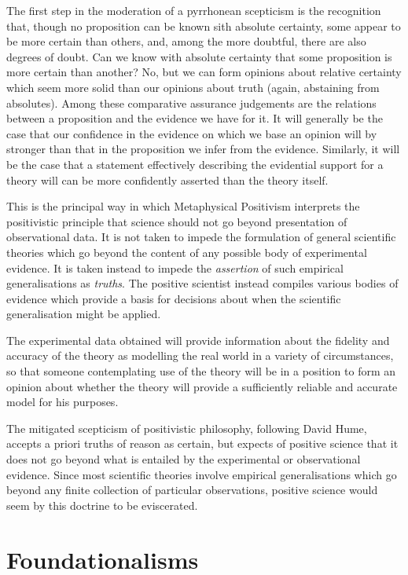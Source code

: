 The first step in the moderation of a pyrrhonean scepticism is the
recognition that, though no proposition can be known sith absolute certainty,
some appear to be more certain than others, and, among the more doubtful,
there are also degrees of doubt.
Can we know with absolute certainty that some proposition is more
certain than another?
No, but we can form opinions about relative certainty which seem
more solid than our opinions about truth (again, abstaining
from absolutes).
Among these comparative assurance judgements are the relations between
a proposition and the evidence we have for it.
It will generally be the case that our confidence in the evidence on
which we base an opinion will by stronger than that in the proposition
we infer from the evidence.
Similarly, it will be the case that a statement effectively describing
the evidential support for a theory will can be more confidently
asserted than the theory itself.

This is the principal way in which Metaphysical Positivism interprets
the positivistic principle that science should not go beyond
presentation of observational data.
It is not taken to impede the formulation of general scientific
theories which go beyond the content of any possible body of
experimental evidence.
It is taken instead to impede the \emph{assertion} of such empirical
generalisations as \emph{truths}.
The positive scientist instead compiles various bodies of evidence
which provide a basis for decisions about when the scientific
generalisation might be applied.

The experimental data obtained will provide information about the
fidelity and accuracy of the theory as modelling the real world in a
variety of circumstances, so that someone contemplating use of the
theory will be in a position to form an opinion about whether the
theory will provide a sufficiently reliable and accurate model for his
purposes.

The mitigated scepticism of positivistic philosophy, following David
Hume, accepts a priori truths of reason as certain, but expects of
positive science that it does not go beyond what is entailed by the
experimental or observational evidence.
Since most scientific theories involve empirical generalisations which
go beyond any finite collection of particular observations, positive
science would seem by this doctrine to be eviscerated.

\section{Foundationalisms}

